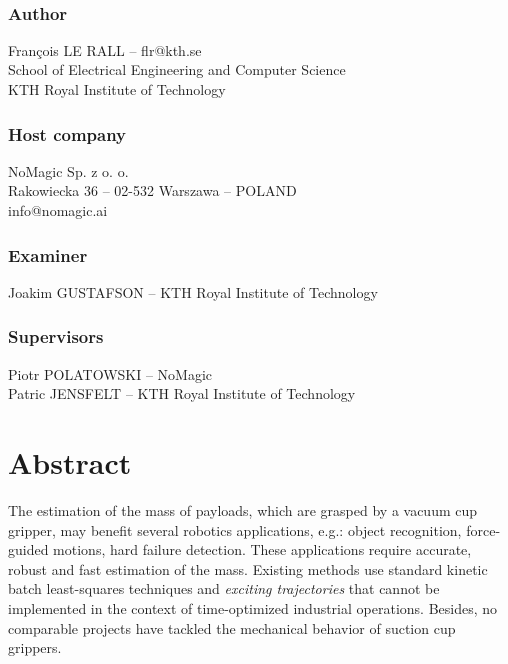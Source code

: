 \documentclass[/home/francois/latex/report/main.tex]{subfiles}
\begin{document}
\newpage
\thispagestyle{plain}

~

\vfill

{ 
	\subsection*{Author}
	François LE RALL – flr@kth.se\\
	School of Electrical Engineering and Computer Science\\
	KTH Royal Institute of Technology

	\subsection*{Host company}
	NoMagic Sp. z o. o.\\
	Rakowiecka 36 – 02-532 Warszawa – POLAND\\
	info@nomagic.ai

	\subsection*{Examiner}
	Joakim GUSTAFSON – KTH Royal Institute of Technology

	\subsection*{Supervisors}
	Piotr POLATOWSKI – NoMagic\\
	Patric JENSFELT – KTH Royal Institute of Technology
	~
}


\newpage
\thispagestyle{plain}
\chapter*{Abstract}

The estimation of the mass of payloads, which are grasped by a vacuum cup gripper, may benefit several robotics applications, e.g.: object recognition, force-guided motions, hard failure detection. These applications require accurate, robust and fast estimation of the mass. Existing methods use standard kinetic batch least-squares techniques and \textit{exciting trajectories} that cannot be implemented in the context of time-optimized industrial operations. Besides, no comparable projects have tackled the mechanical behavior of suction cup grippers.
\end{document}
